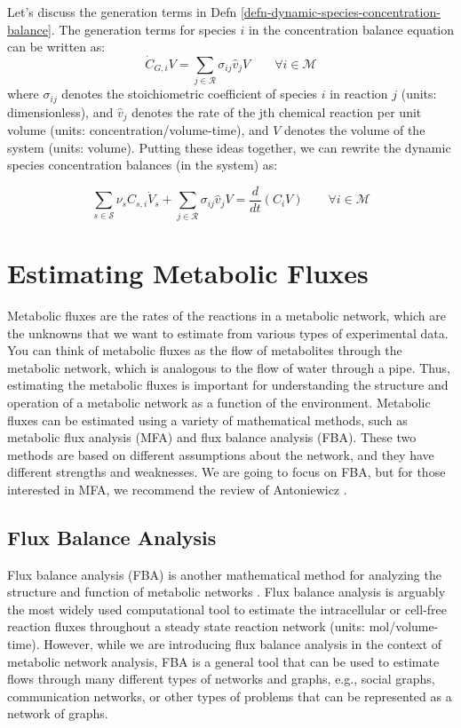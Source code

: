 \documentclass{article}[11pt]
\begin{document}
Let's discuss the generation terms in Defn \ref{defn-dynamic-species-concentration-balance}.
The generation terms for species $i$ in the concentration balance equation can be written as:
\begin{equation}\label{eqn:concentration-gen-terms}
\dot{C}_{G,i}V = \sum_{j\in\mathcal{R}}\sigma_{ij}\hat{v}_{j}V\qquad\forall{i}\in\mathcal{M}
\end{equation}
where $\sigma_{ij}$ denotes the stoichiometric coefficient of species $i$ in reaction $j$ (units: dimensionless), 
and $\hat{v}_{j}$ denotes the rate of the jth chemical reaction per unit volume (units: concentration/volume-time), 
and $V$ denotes the volume of the system (units: volume).
Putting these ideas together, we can rewrite the dynamic species concentration balances (in the system) as:
\begin{mdframed}[backgroundcolor=lgray]
\begin{equation}\label{eqn:concentration-balance-with-extent}
\sum_{s\in\mathcal{S}}\nu_{s}C_{s,i}\dot{V}_{s} + \sum_{j\in\mathcal{R}}\sigma_{ij}\hat{v}_{j}V = \frac{d}{dt}\left(C_{i}V\right)\qquad\forall{i\in\mathcal{M}}
\end{equation}
\end{mdframed}

\section{Estimating Metabolic Fluxes}
Metabolic fluxes are the rates of the reactions in a metabolic network, which are the unknowns that we want to estimate from various types of experimental data.
You can think of metabolic fluxes as the flow of metabolites through the metabolic network, which is analogous to the flow of water through a pipe.
Thus, estimating the metabolic fluxes is important for understanding the structure and operation of a metabolic network as a function of the environment.
Metabolic fluxes can be estimated using a variety of mathematical methods, such as metabolic flux analysis (MFA) and flux balance analysis (FBA).
These two methods are based on different assumptions about the network, and they have different strengths and weaknesses.
We are going to focus on FBA, but for those interested in MFA, we recommend the review of Antoniewicz \cite{ANTONIEWICZ20212}.

\subsection{Flux Balance Analysis}
Flux balance analysis (FBA) is another mathematical method for analyzing the structure and function of metabolic networks \cite{Orth:2010aa}.
Flux balance analysis is arguably the most widely used computational tool to estimate the intracellular or cell-free reaction fluxes
throughout a steady state reaction network (units: mol/volume-time). 
However, while we are introducing flux balance analysis in the context of metabolic network analysis, FBA is a general tool that can be used to 
estimate flows through many different types of networks and graphs, e.g., social graphs, communication networks, or other types of problems that can be represented as a network of graphs.  
\end{document}
